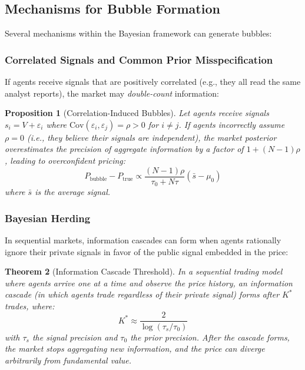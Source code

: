 \documentclass[12pt,a4paper]{article}
\newtheorem{theorem}{Theorem}[section]
\newtheorem{proposition}[theorem]{Proposition}
\theoremstyle{definition}
\newcommand{\Cov}{\mathrm{Cov}}
\begin{document}
\subsection{Mechanisms for Bubble Formation}

Several mechanisms within the Bayesian framework can generate bubbles:

\subsubsection{Correlated Signals and Common Prior Misspecification}

If agents receive signals that are positively correlated (e.g., they all read the same analyst reports), the market may \emph{double-count} information:

\begin{proposition}[Correlation-Induced Bubbles]\label{prop:corr_bubble}
Let agents receive signals $s_i = V + \varepsilon_i$ where $\Cov(\varepsilon_i, \varepsilon_j) = \rho > 0$ for $i \neq j$. If agents incorrectly assume $\rho = 0$ (i.e., they believe their signals are independent), the market posterior overestimates the precision of aggregate information by a factor of $1 + (N-1)\rho$, leading to overconfident pricing:
\begin{equation}
    P_{\text{bubble}} - P_{\text{true}} \propto \frac{(N-1)\rho}{\tau_0 + N\tau}(\bar{s} - \mu_0)
\end{equation}
where $\bar{s}$ is the average signal.
\end{proposition}

\subsubsection{Bayesian Herding}

In sequential markets, information cascades can form when agents rationally ignore their private signals in favor of the public signal embedded in the price:

\begin{theorem}[Information Cascade Threshold]\label{thm:cascade}
In a sequential trading model where agents arrive one at a time and observe the price history, an information cascade (in which agents trade regardless of their private signal) forms after $K^*$ trades, where:
\begin{equation}
    K^* \approx \frac{2}{\log(\tau_s / \tau_0)}
\end{equation}
with $\tau_s$ the signal precision and $\tau_0$ the prior precision. After the cascade forms, the market stops aggregating new information, and the price can diverge arbitrarily from fundamental value.
\end{theorem}
\end{document}
